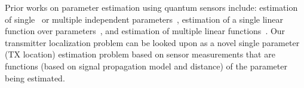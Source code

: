 Prior works on parameter estimation using quantum sensors
include: estimation of single~\cite{Giovannetti_2011} %
or multiple independent parameters~\cite{Proctor_2018}, estimation of a single linear function over parameters~\cite{Altenburg_2019}, and estimation of multiple linear functions~\cite{Rubio_2020}. Our transmitter localization problem can be looked upon
as a novel single parameter (TX location) estimation problem based on sensor measurements that are functions (based on signal propagation model and distance) of the parameter being estimated.